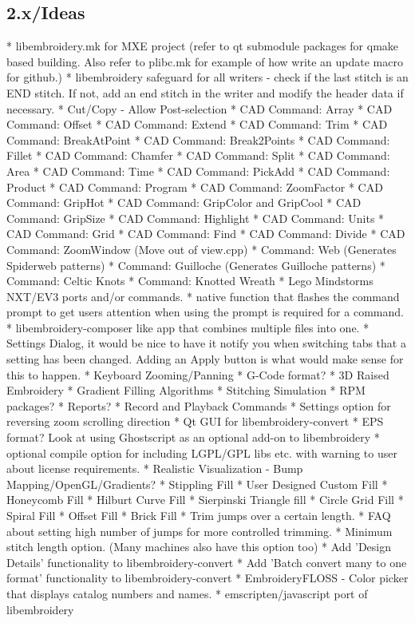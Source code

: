 \documentclass[11pt]{report}
\begin{document}
\subsection{2.x/Ideas}

* libembroidery.mk for MXE project (refer to qt submodule packages for qmake based building. Also refer to plibc.mk for example of how write an update macro for github.)
* libembroidery safeguard for all writers - check if the last stitch is an END stitch. If not, add an end stitch in the writer and modify the header data if necessary.
* Cut/Copy - Allow Post-selection
* CAD Command: Array
* CAD Command: Offset
* CAD Command: Extend
* CAD Command: Trim
* CAD Command: BreakAtPoint
* CAD Command: Break2Points
* CAD Command: Fillet
* CAD Command: Chamfer
* CAD Command: Split
* CAD Command: Area
* CAD Command: Time
* CAD Command: PickAdd
* CAD Command: Product
* CAD Command: Program
* CAD Command: ZoomFactor
* CAD Command: GripHot
* CAD Command: GripColor and GripCool
* CAD Command: GripSize
* CAD Command: Highlight
* CAD Command: Units
* CAD Command: Grid
* CAD Command: Find
* CAD Command: Divide
* CAD Command: ZoomWindow (Move out of view.cpp)
* Command: Web (Generates Spiderweb patterns)
* Command: Guilloche (Generates Guilloche patterns)
* Command: Celtic Knots
* Command: Knotted Wreath
* Lego Mindstorms NXT/EV3 ports and/or commands.
* native function that flashes the command prompt to get users attention when using the
prompt is required for a command.
* libembroidery-composer like app that combines multiple files into one.
* Settings Dialog, it would be nice to have it notify you when switching tabs that a
setting has been changed. Adding an Apply button is what would make sense for this to happen.
* Keyboard Zooming/Panning
* G-Code format?
* 3D Raised Embroidery
* Gradient Filling Algorithms
* Stitching Simulation
* RPM packages?
* Reports?
* Record and Playback Commands
* Settings option for reversing zoom scrolling direction
* Qt GUI for libembroidery-convert
* EPS format? Look at using Ghostscript as an optional add-on to libembroidery
* optional compile option for including LGPL/GPL libs etc. with warning to user about license requirements.
* Realistic Visualization - Bump Mapping/OpenGL/Gradients?
* Stippling Fill
* User Designed Custom Fill
* Honeycomb Fill
* Hilburt Curve Fill
* Sierpinski Triangle fill
* Circle Grid Fill
* Spiral Fill
* Offset Fill
* Brick Fill
* Trim jumps over a certain length.
* FAQ about setting high number of jumps for more controlled trimming.
* Minimum stitch length option. (Many machines also have this option too)
* Add 'Design Details' functionality to libembroidery-convert
* Add 'Batch convert many to one format' functionality to libembroidery-convert
* EmbroideryFLOSS - Color picker that displays catalog numbers and names.
* emscripten/javascript port of libembroidery
\end{document}
